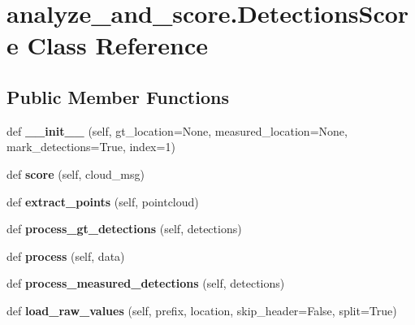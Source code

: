 \hypertarget{classanalyze__and__score_1_1DetectionsScore}{}\section{analyze\+\_\+and\+\_\+score.\+Detections\+Score Class Reference}
\label{classanalyze__and__score_1_1DetectionsScore}
\subsection*{Public Member Functions}
\begin{DoxyCompactItemize}
\item 
\mbox{\label{classanalyze__and__score_1_1DetectionsScore_a34658bc66c2e0d059030fb305df3b6d8}} 
def {\bfseries \+\_\+\+\_\+init\+\_\+\+\_\+} (self, gt\+\_\+location=None, measured\+\_\+location=None, mark\+\_\+detections=True, index=1)
\item 
\mbox{\label{classanalyze__and__score_1_1DetectionsScore_aa17aace1e596ea62b047863d1063e1b2}} 
def {\bfseries score} (self, cloud\+\_\+msg)
\item 
\mbox{\label{classanalyze__and__score_1_1DetectionsScore_ac5ae40965eb9a01674c90840bc401c08}} 
def {\bfseries extract\+\_\+points} (self, pointcloud)
\item 
\mbox{\label{classanalyze__and__score_1_1DetectionsScore_af1d6c4d5fb24556d498c468e06d2ac44}} 
def {\bfseries process\+\_\+gt\+\_\+detections} (self, detections)
\item 
\mbox{\label{classanalyze__and__score_1_1DetectionsScore_a5632e8f4315bbbecdf009f2c06cc8f21}} 
def {\bfseries process} (self, data)
\item 
\mbox{\label{classanalyze__and__score_1_1DetectionsScore_a1803c542fe1682f0513767f19b532d61}} 
def {\bfseries process\+\_\+measured\+\_\+detections} (self, detections)
\item 
\mbox{\label{classanalyze__and__score_1_1DetectionsScore_a0d83b00e0b2f4934f64aa9fe6d8be54e}} 
def {\bfseries load\+\_\+raw\+\_\+values} (self, prefix, location, skip\+\_\+header=False, split=True)
\end{DoxyCompactItemize}
